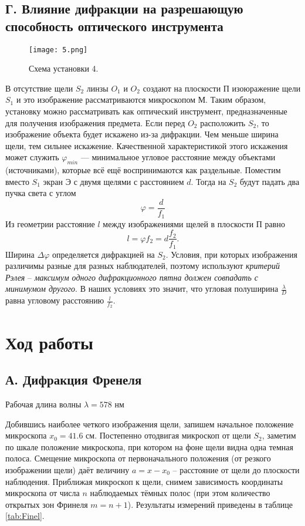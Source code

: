 \subsection*{Г. Влияние дифракции на разрешающую способность оптического инструмента}
\begin{figure}[h]
	\texttt{[image: 5.png]}
	\centering
	\caption{Схема установки 4.}
\end{figure}
В отсутствие щели $S_2$ линзы $O_1$ и $O_2$ создают на плоскости П изоюражение щели $S_1$ и это изображение рассматриваются микроскопом М. Таким образом, установку можно рассматривать как оптический инструмент, предназначенные для получения изображения предмета. Если перед $O_2$ расположить $S_2$, то изображение объекта будет искажено из-за дифракции. Чем меньше ширина щели, тем сильнее искажение. Качественной характеристикой этого искажения может служить $\varphi_{min}$ --- минимальное угловое расстояние между объектами (источниками), которые всё ещё воспринимаются как раздельные. Поместим вместо $S_1$ экран Э с двумя щелями с расстоянием $d$. Тогда на $S_2$ будут падать два пучка света с углом
\begin{equation}
	\varphi = \dfrac{d}{f_1}
\end{equation}
Из геометрии расстояние $l$ между изображениями щелей в плоскости П равно
\begin{equation}
	l = \varphi f_2 = d \dfrac{f_2}{f_1}.
\end{equation}
Ширина $\Delta \varphi$ определяется дифракцией на $S_2$. Условия, при которых изображения различимы разные для разных наблюдателей, поэтому используют \textit{критерий Рэлея} -- \textit{максимум одного дифракционного пятна должен совпадать с минимумом другого}. В наших условиях это значит, что угловая полуширина $\frac{\lambda}{D}$ равна угловому расстоянию $\frac{l}{f_2}$.

\section*{Ход работы}

\subsection*{А. Дифракция Френеля}

\begin{center}
	Рабочая длина волны $\lambda = 578$ нм
\end{center}

Добившись наиболее четкого изображения щели, запишем начальное положение микроскопа $x_0 = 41.6$ см. Постепенно отодвигая микроскоп от щели $S_2$, заметим по шкале положение микроскопа, при котором на фоне щели видна одна темная полоса. Смещение микроскопа от первоначального положения (от резкого
изображении щели) даёт величину $a = x - x_0$ -- расстояние от щели до плоскости наблюдения. Приближая микроскоп к щели, снимем зависимость координаты
микроскопа от числа $n$ наблюдаемых тёмных полос (при этом количество открытых зон Фринеля $m = n + 1$). Результаты измерений приведены в таблице \ref{tab:Finel}.

